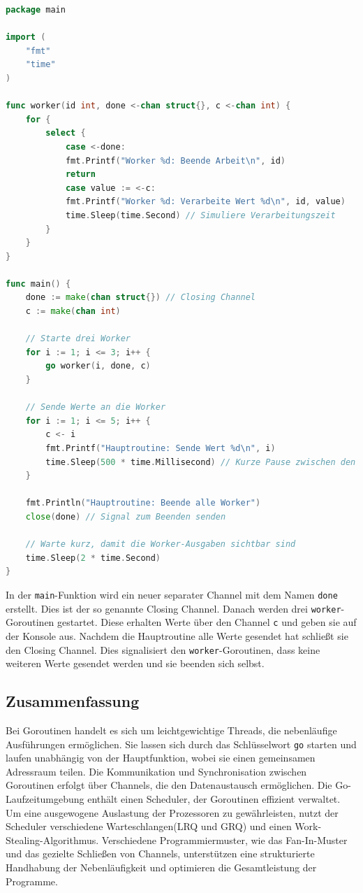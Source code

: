 \documentclass[fontsize=12pt,paper=a4,twoside=semi,parskip=half-,headsepline,headinclude]{scrreprt}
\begin{document}
\begin{lstlisting}[language=Go,extendedchars=true]
package main

import (
	"fmt"
	"time"
)

func worker(id int, done <-chan struct{}, c <-chan int) {
	for {
		select {
			case <-done:
			fmt.Printf("Worker %d: Beende Arbeit\n", id)
			return
			case value := <-c:
			fmt.Printf("Worker %d: Verarbeite Wert %d\n", id, value)
			time.Sleep(time.Second) // Simuliere Verarbeitungszeit
		}
	}
}

func main() {
	done := make(chan struct{}) // Closing Channel
	c := make(chan int)
	
	// Starte drei Worker
	for i := 1; i <= 3; i++ {
		go worker(i, done, c)
	}
	
	// Sende Werte an die Worker
	for i := 1; i <= 5; i++ {
		c <- i
		fmt.Printf("Hauptroutine: Sende Wert %d\n", i)
		time.Sleep(500 * time.Millisecond) // Kurze Pause zwischen den Sendungen
	}
	
	fmt.Println("Hauptroutine: Beende alle Worker")
	close(done) // Signal zum Beenden senden
	
	// Warte kurz, damit die Worker-Ausgaben sichtbar sind
	time.Sleep(2 * time.Second)
}
\end{lstlisting}

In der \texttt{main}-Funktion wird ein neuer separater Channel mit dem Namen \texttt{done} erstellt. Dies ist der so genannte Closing Channel. Danach werden drei \texttt{worker}-Goroutinen ge\-star\-tet. Diese erhalten Werte über den Channel \texttt{c} und geben sie auf der Konsole aus. Nachdem die Hauptroutine alle Werte gesendet hat schließt sie den Closing Channel. Dies signalisiert den  \texttt{worker}-Goroutinen, dass keine weiteren Werte gesendet werden und sie beenden sich selbst.

\subsection{Zusammenfassung}

Bei Goroutinen handelt es sich um leichtgewichtige Threads, die nebenläufige Ausführungen ermöglichen. Sie lassen sich durch das Schlüsselwort \texttt{go} starten und laufen unabhängig von der Hauptfunktion, wobei sie einen gemeinsamen Adressraum teilen. Die Kommunikation und Synchronisation zwischen Goroutinen erfolgt über Channels, die den Datenaustausch ermöglichen. Die Go-Laufzeitumgebung enthält einen Scheduler, der Goroutinen effizient verwaltet. Um eine ausgewogene Auslastung der Prozessoren zu gewährleisten, nutzt der Scheduler verschiedene Warteschlangen(LRQ und GRQ) und einen Work-Stealing-Algorithmus. Verschiedene Programmiermuster, wie das Fan-In-Muster und das gezielte Schließen von Channels, unterstützen eine strukturierte Handhabung der Nebenläufigkeit und optimieren die Gesamtleistung der Programme.
\end{document}
